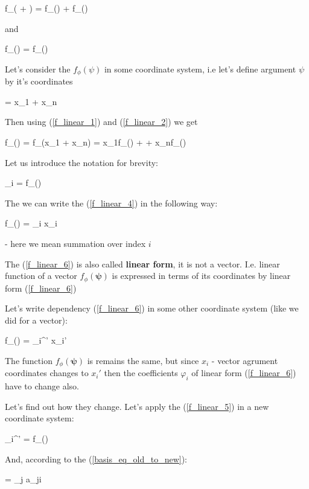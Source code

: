 \documentclass{article}
\begin{document}
\beq \label{f_linear_1}
f_{\phi}( + ) = f_{\phi}() + f_{\phi}()
\eeq

and

\beq \label{f_linear_2}
f_{\phi}(\alpha\bm{\psi}) = \alpha f_{\phi}(\bm{\psi})
\eeq

Let's consider the $f_{\phi}(\psi)$ in some coordinate system, i.e let's define argument $\psi$ by it's coordinates

\beq \label{f_linear_3}
\bm{\psi} = x_{1} + \cdots x_{n}
\eeq

Then using (\ref{f_linear_1}) and (\ref{f_linear_2}) we get

\beq \label{f_linear_4}
f_{\phi}() = f_{\phi}(x_{1} + \cdots x_{n}) =
x_{1}f_{\phi}() + \cdots + x_{n}f_{\phi}()
\eeq

Let us introduce the notation for brevity:

\beq \label{f_linear_5}
\varphi_{i} = f_{\phi}()
\eeq

The we can write the (\ref{f_linear_4}) in the following way:

\beq \label{f_linear_6}
f_{\phi}(\bm{\psi}) = \varphi_{i} x_{i}
\eeq

- here we mean summation over index $i$

The (\ref{f_linear_6}) is also called \textbf{linear form}, it is not a vector.
I.e. linear function of a vector $f_{\phi}(\bm{\psi})$ is expressed in terms of its coordinates by linear form (\ref{f_linear_6})


Let's write dependency (\ref{f_linear_6}) in some other coordinate system (like we did for a vector):

\beq \label{f_linear_7}
f_{\phi}(\bm{\psi}) = \varphi_{i}^{'} x_{i}{'}
\eeq

The function $f_{\phi}(\bm{\psi})$ is remains the same, but since $x_{i}$ - vector agrument coordinates changes to $x_{i}{'}$ then the coefficients $\varphi_{i}$ of linear form (\ref{f_linear_6}) have to change also.

Let's find out how they change.
Let's apply the (\ref{f_linear_5}) in a new coordinate system:

\beq \label{f_linear_8}
\varphi_{i}^{'} = f_{\phi}()
\eeq

And, according to the (\ref{basis_eq_old_to_new}):

\beq \label{f_linear_9}
 = \sum_{j} a_{ji}
\eeq
\end{document}
